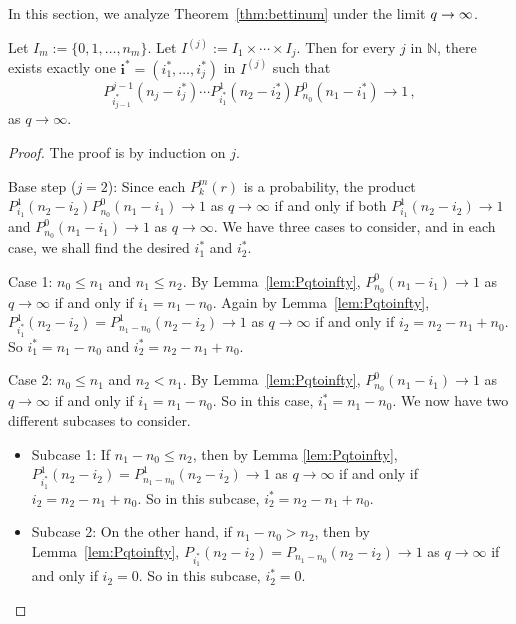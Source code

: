 In this section, we analyze Theorem~\ref{thm:bettinum} under the 
limit $q \rightarrow \infty$.

\begin{proposition}
  \label{prop:oneseq}
Let $I_m:= \{0,1,\ldots, n_m\}$.  Let $I^{(j)}:= I_1\times\cdots \times I_j$.
Then for every $j$ in $\mathbb{N}$, there exists exactly one $\mathbf{i}^\ast =
(i_1^\ast,\ldots, i_j^\ast)$ in $I^{(j)}$ such that 
\[
  P_{i_{j-1}^\ast}^{j-1}(n_j-i_j^\ast)\cdots
  P_{i_1^\ast}^1(n_2-i_2^\ast)P_{n_0}^0(n_1-i_1^\ast) \to 1 \, ,
\]
as $q\to\infty$.
\end{proposition}

\begin{proof}
The proof is by induction on $j$.


Base step ($j=2$): Since each $P^m_k(r)$ is a probability, the product $P_{i_1}^1(n_2 -
i_2)P_{n_0}^0 (n_1 - i_1) \to 1$ as $q\to\infty$ if and only if both
$P_{i_1}^1(n_2 - i_2) \to 1$ and $P_{n_0}^0 (n_1 - i_1) \to 1$ as $q\to
\infty$.  We have three cases to consider, and in each case, we shall find the
desired $i_1^\ast$ and $i_2^\ast$.

Case 1: $n_0\leq n_1$ and $n_1\leq n_2$.  By Lemma~\ref{lem:Pqtoinfty},
$P_{n_0}^0 (n_1 - i_1) \to 1$ as $q\to\infty$ if and only if $i_1 = n_1 - n_0$.
Again by Lemma~\ref{lem:Pqtoinfty}, $P_{i_1^\ast}^{1}(n_2 - i_2) = P_{n_1 - n_0}^{1}(n_2 - i_2)
\to 1$ as $q\to\infty$ if and only if $i_2 = n_2 - n_1 + n_0$.  So $i_1^\ast = n_1 - n_0$
and $i_2^\ast = n_2 - n_1 + n_0$.

Case 2: $n_0 \leq n_1$ and $n_2 <n_1$. By Lemma~\ref{lem:Pqtoinfty},
$P_{n_0}^0 (n_1 - i_1) \to 1$ as $q\to\infty$ if and only if $i_1 = n_1 - n_0$.
So in this case, $i_1^\ast = n_1 - n_0$. We now have two different subcases to
consider.  
\begin{itemize} 
  \item Subcase 1: If $n_1 - n_0\leq n_2$, then by
    Lemma \ref{lem:Pqtoinfty}, $P_{i_1^\ast}^1(n_2 - i_2) =
    P_{n_1-n_0}^1(n_2-i_2) \to 1$ as $q\to\infty$ if and only if $i_2 = n_2 -
    n_1 + n_0$.  So in this subcase, $i_2^\ast = n_2 - n_1 + n_0$.  
  \item Subcase 2: On the other hand, if $n_1 - n_0 >n_2$, then by 
  Lemma~\ref{lem:Pqtoinfty}, $P_{i_1^\ast}(n_2 - i_2) = P_{n_1-n_0}(n_2-i_2)
    \to 1$ as $q\to\infty$ if and only if $i_2 = 0$.  So in this subcase,
    $i_2^\ast = 0$.  
\end{itemize}


\end{proof}
